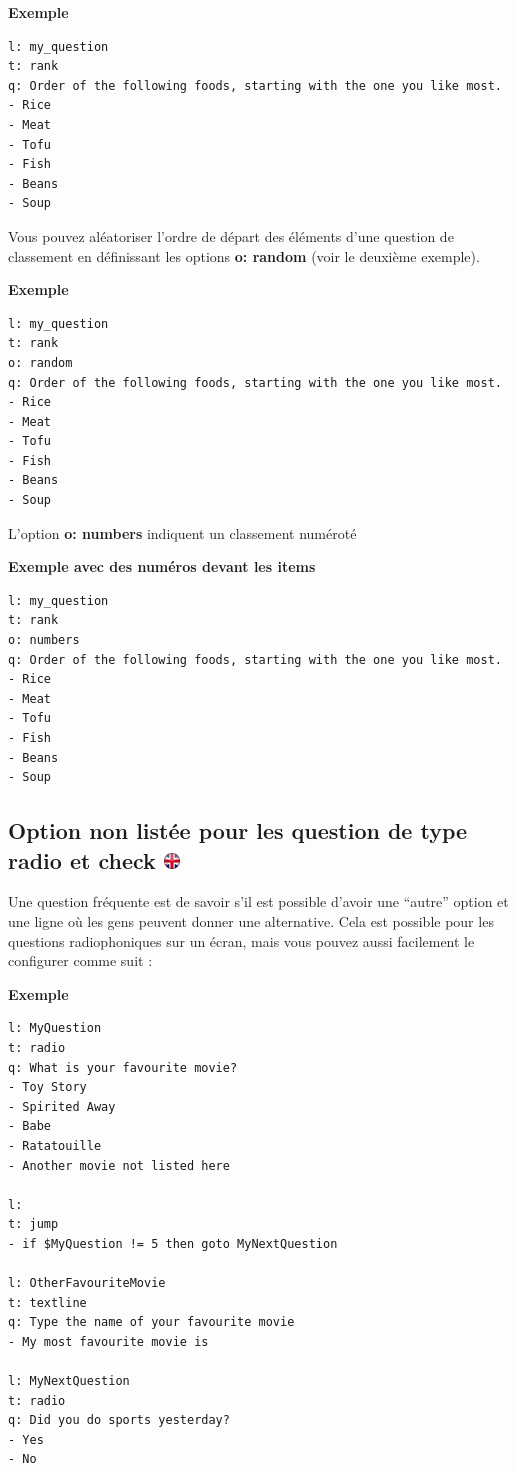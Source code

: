 \documentclass[
]{book}
\begin{document}
\textbf{Exemple}

\begin{verbatim}
l: my_question
t: rank
q: Order of the following foods, starting with the one you like most.
- Rice
- Meat
- Tofu
- Fish
- Beans
- Soup
\end{verbatim}

Vous pouvez aléatoriser l'ordre de départ des éléments d'une question de classement en définissant les options \textbf{o: random} (voir le deuxième exemple).

\textbf{Exemple}

\begin{verbatim}
l: my_question
t: rank
o: random
q: Order of the following foods, starting with the one you like most.
- Rice
- Meat
- Tofu
- Fish
- Beans
- Soup
\end{verbatim}

L'option \textbf{o: numbers} indiquent un classement numéroté

\textbf{Exemple avec des numéros devant les items}

\begin{verbatim}
l: my_question
t: rank
o: numbers
q: Order of the following foods, starting with the one you like most.
- Rice
- Meat
- Tofu
- Fish
- Beans
- Soup
\end{verbatim}

\hypertarget{option-non-listuxe9e-pour-les-question-de-type-radio-et-check}{%
\subsection[Option non listée pour les question de type radio et check ]{\texorpdfstring{Option non listée pour les question de type radio et check \href{https://www.psytoolkit.org/doc3.4.0/online-survey-syntax.html\#others}{\protect\includegraphics{img/ukflag.png}}}{Option non listée pour les question de type radio et check }}\label{option-non-listuxe9e-pour-les-question-de-type-radio-et-check}}

Une question fréquente est de savoir s'il est possible d'avoir une ``autre'' option et une ligne où les gens peuvent donner une alternative. Cela est possible pour les questions radiophoniques sur un écran, mais vous pouvez aussi facilement le configurer comme suit :

\textbf{Exemple}

\begin{verbatim}
l: MyQuestion
t: radio
q: What is your favourite movie?
- Toy Story
- Spirited Away
- Babe
- Ratatouille
- Another movie not listed here

l:
t: jump
- if $MyQuestion != 5 then goto MyNextQuestion

l: OtherFavouriteMovie
t: textline
q: Type the name of your favourite movie
- My most favourite movie is

l: MyNextQuestion
t: radio
q: Did you do sports yesterday?
- Yes
- No
\end{verbatim}
\end{document}
